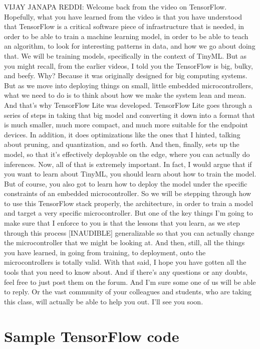 VIJAY JANAPA REDDI: Welcome back from the video on TensorFlow.
Hopefully, what you have learned from the video
is that you have understood that TensorFlow is a critical software
piece of infrastructure that is needed, in order
to be able to train a machine learning model,
in order to be able to teach an algorithm,
to look for interesting patterns in data, and how we go about doing that.
We will be training models, specifically in the context of TinyML.
But as you might recall, from the earlier videos,
I told you the TensorFlow is big, bulky, and beefy.
Why?
Because it was originally designed for big computing systems.
But as we move into deploying things on small, little embedded
microcontrollers, what we need to do is to think about how
we make the system lean and mean.
And that's why TensorFlow Lite was developed.
TensorFlow Lite goes through a series of steps in taking that big model
and converting it down into a format that
is much smaller, much more compact, and much more
suitable for the endpoint devices.
In addition, it does optimizations like the ones
that I hinted, talking about pruning, and quantization, and so forth.
And then, finally, sets up the model, so that it's effectively
deployable on the edge, where you can actually do inferences.
Now, all of that is extremely important.
In fact, I would argue that if you want to learn about TinyML,
you should learn about how to train the model.
But of course, you also got to learn how to deploy
the model under the specific constraints of an embedded microcontroller.
So we will be stepping through how to use this TensorFlow stack properly,
the architecture, in order to train a model
and target a very specific microcontroller.
But one of the key things I'm going to make sure that I enforce to you
is that the lessons that you learn, as we
step through this process [INAUDIBLE] generalizable
so that you can actually change the microcontroller that we
might be looking at.
And then, still, all the things you have learned, in going from training,
to deployment, onto the microcontrollers is totally valid.
With that said, I hope you have gotten all the tools
that you need to know about.
And if there's any questions or any doubts,
feel free to just post them on the forum.
And I'm sure some one of us will be able to reply.
Or the vast community of your colleagues and students,
who are taking this class, will actually be able to help you out.
I'll see you soon.

\section{Sample TensorFlow code}

